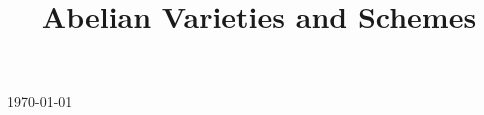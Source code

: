 

\title{Abelian Varieties and Schemes}

\usepackage[sort=standard]{glossaries} 
\makeglossaries



\maketitle
\centerline{\today}
\tableofcontents







